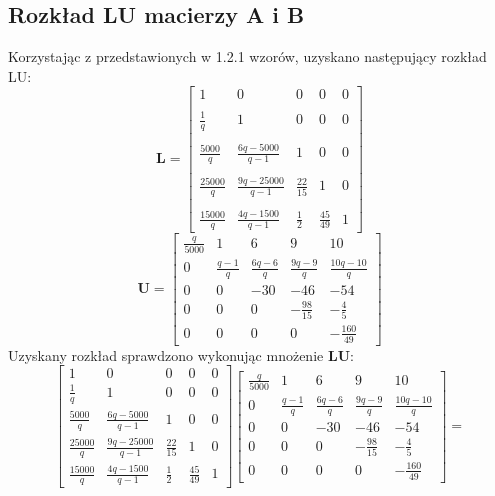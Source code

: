 \documentclass[a4paper]{article}
\begin{document}
\subsection{Rozkład LU macierzy A i B}
Korzystając z przedstawionych w 1.2.1 wzorów, uzyskano następujący rozkład LU:
$$
\textbf{L}=
\left[
\begin{array}
{ccccc}
1&0&0&0&0\\ \\
\frac{1}{q}&1&0&0&0\\ \\
\frac{5000}{q}&\frac{6q-5000}{q-1}&1&0&0\\ \\
\frac{25000}{q}&\frac{9q-25000}{q-1}&\frac{22}{15}&1&0\\ \\
\frac{15000}{q}&\frac{4q-1500}{q-1}&\frac{1}{2}&\frac{45}{49}&1
\end{array}
\right]
$$
$$
\textbf{U}=
\left[
\begin{array}
{ccccc}
\frac{q}{5000}&1&6&9&10\\
0&\frac{q-1}{q}&\frac{6q-6}{q}&\frac{9q-9}{q}&\frac{10q-10}{q}\\
0&0&-30&-46&-54\\
0&0&0&-\frac{98}{15}&-\frac{4}{5}\\
0&0&0&0&-\frac{160}{49}
\end{array}
\right]
$$
Uzyskany rozkład sprawdzono wykonując mnożenie \textbf{LU}:
$$
\left[
\begin{array}
{ccccc}
1&0&0&0&0\\
\frac{1}{q}&1&0&0&0\\
\frac{5000}{q}&\frac{6q-5000}{q-1}&1&0&0\\
\frac{25000}{q}&\frac{9q-25000}{q-1}&\frac{22}{15}&1&0\\
\frac{15000}{q}&\frac{4q-1500}{q-1}&\frac{1}{2}&\frac{45}{49}&1
\end{array}
\right]
\left[
\begin{array}
{ccccc}
\frac{q}{5000}&1&6&9&10\\
0&\frac{q-1}{q}&\frac{6q-6}{q}&\frac{9q-9}{q}&\frac{10q-10}{q}\\
0&0&-30&-46&-54\\
0&0&0&-\frac{98}{15}&-\frac{4}{5}\\
0&0&0&0&-\frac{160}{49}
\end{array}
\right]
=
$$
\end{document}
